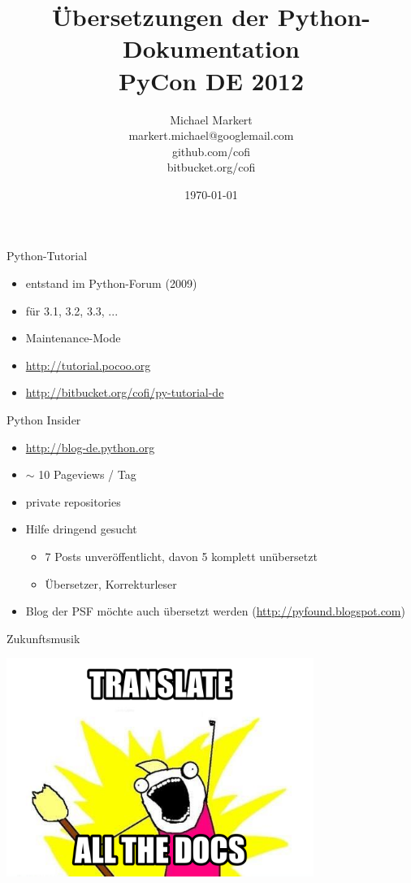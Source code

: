 \documentclass{beamer}
\title[Übersetzungen der Python-Dokumentation]{Übersetzungen der Python-Dokumentation\\
PyCon DE 2012}
\author[markert.michael@googlemail.com]{Michael Markert \\
  markert.michael@googlemail.com\\
  github.com/cofi\\
  bitbucket.org/cofi}
\date{\today}
\begin{document}
\begin{frame}[plain]
  \titlepage
\end{frame}

\begin{frame}{Python-Tutorial}
  \begin{itemize}
  \item entstand im Python-Forum (2009)
  \item für 3.1, 3.2, 3.3, ...
  \item Maintenance-Mode
  \item \url{http://tutorial.pocoo.org}
  \item \url{http://bitbucket.org/cofi/py-tutorial-de}
  \end{itemize}
\end{frame}
\begin{frame}{}
  \begin{center}
  \end{center}
\end{frame}
\begin{frame}{Python Insider}
  \begin{itemize}
  \item \url{http://blog-de.python.org}
  \item $\sim$ 10 Pageviews / Tag
  \item private repositories
  \item Hilfe dringend gesucht
    \begin{itemize}
    \item 7 Posts unveröffentlicht, davon 5 komplett unübersetzt
    \item Übersetzer, Korrekturleser
    \end{itemize}
  \item Blog der PSF möchte auch übersetzt werden (\url{http://pyfound.blogspot.com})
  \end{itemize}
\end{frame}
\begin{frame}{Zukunftsmusik}
  \begin{center}
    \includegraphics[width=10cm]{translate-meme}
  \end{center}
\end{frame}
\end{document}
